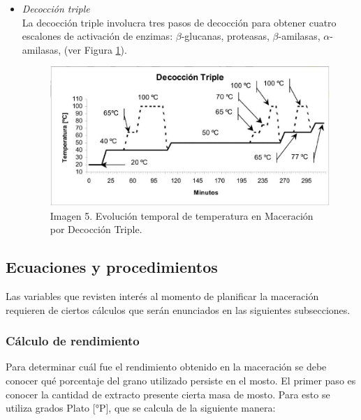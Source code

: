 \begin{itemize}
                    \item \textit{Decocción triple} \\ La decocción triple involucra tres pasos de decocción para obtener cuatro escalones de activación de enzimas: $\beta$-glucanas, proteasas, $\beta$-amilasas, $\alpha$-amilasas, (ver Figura \ref{MaceracionDecoccionTriple}).
                    
                    \begin{figure} [ht]		                                                            \centerline{\includegraphics[scale=0.5]{decoccion_triple.jpg}}
                        \caption{Imagen 5. Evolución temporal de temperatura en Maceración por Decocción Triple. \cite{Ceresvis}}
                        \label{MaceracionDecoccionTriple}
                    \end{figure}
                    
                \end{itemize}
        \hfill \break        
        \subsection{Ecuaciones y procedimientos}
            \label{EcuacionesyProcedimientos}
            \par Las variables que revisten interés al momento de planificar la maceración requieren de ciertos cálculos que serán enunciados en las siguientes subsecciones. 
            
            \subsubsection{Cálculo de rendimiento }
            \label{AT_CalculodeRendimiento}
                \par Para determinar cuál fue el rendimiento obtenido en la maceración se debe conocer qué porcentaje del grano utilizado persiste en el mosto. El primer paso es conocer la cantidad de extracto presente cierta masa de mosto. Para esto se utiliza grados Plato [°P], que se calcula de la siguiente manera:
                

